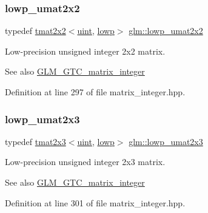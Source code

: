 \subsubsection{\texorpdfstring{lowp\_umat2x2}{lowp\_umat2x2}}
{\footnotesize\ttfamily typedef \mbox{\hyperlink{structglm_1_1tmat2x2}{tmat2x2}}$<$\mbox{\hyperlink{group__core__precision_ga4fd29415871152bfb5abd588334147c8}{uint}}, \mbox{\hyperlink{namespaceglm_a0f04f086094c747d227af4425893f545ae161af3fc695e696ce3bf69f7332bc2d}{lowp}}$>$ \mbox{\hyperlink{group__gtc__matrix__integer_ga13b2812e9b0af47e0f498391383d145a}{glm\+::lowp\+\_\+umat2x2}}}

Low-\/precision unsigned integer 2x2 matrix. \begin{DoxySeeAlso}{See also}
\mbox{\hyperlink{group__gtc__matrix__integer}{G\+L\+M\+\_\+\+G\+T\+C\+\_\+matrix\+\_\+integer}} 
\end{DoxySeeAlso}


Definition at line 297 of file matrix\+\_\+integer.\+hpp.

\mbox{\label{group__gtc__matrix__integer_ga3af254ecb450000314422b1730afacc0}} 
\subsubsection{\texorpdfstring{lowp\_umat2x3}{lowp\_umat2x3}}
{\footnotesize\ttfamily typedef \mbox{\hyperlink{structglm_1_1tmat2x3}{tmat2x3}}$<$\mbox{\hyperlink{group__core__precision_ga4fd29415871152bfb5abd588334147c8}{uint}}, \mbox{\hyperlink{namespaceglm_a0f04f086094c747d227af4425893f545ae161af3fc695e696ce3bf69f7332bc2d}{lowp}}$>$ \mbox{\hyperlink{group__gtc__matrix__integer_ga3af254ecb450000314422b1730afacc0}{glm\+::lowp\+\_\+umat2x3}}}

Low-\/precision unsigned integer 2x3 matrix. \begin{DoxySeeAlso}{See also}
\mbox{\hyperlink{group__gtc__matrix__integer}{G\+L\+M\+\_\+\+G\+T\+C\+\_\+matrix\+\_\+integer}} 
\end{DoxySeeAlso}


Definition at line 301 of file matrix\+\_\+integer.\+hpp.

\mbox{\label{group__gtc__matrix__integer_gad5e8f08c103d5dd33767e31938357aa6}} 
